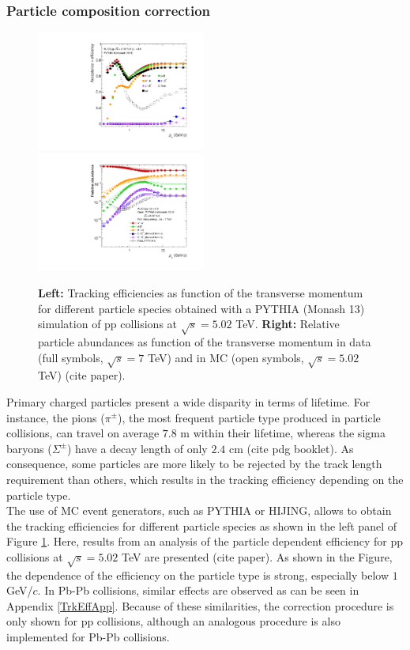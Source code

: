 \documentclass[12pt,a4paper]{report}
\begin{document}
\subsubsection{Particle composition correction}
\begin{figure}[tb!]
\centering
\includegraphics[width=0.495\textwidth]{Plots/5TeVMonash13_TrkEff_without-91972.pdf}  
\includegraphics[width=0.495\textwidth]{Plots/5TeVMonash13_Abundances-91973.pdf}  
\caption{\textbf{Left: }Tracking efficiencies as function of the transverse momentum for different particle species obtained with a PYTHIA (Monash 13) simulation of pp collisions at $\sqrt{s} = 5.02$ TeV. \textbf{Right:} Relative particle abundances as function of the transverse momentum in data (full symbols,  $\sqrt{s} = 7$ TeV) and in MC (open symbols,  $\sqrt{s} = 5.02$ TeV) (cite paper).}
\label{trckEffParticles}
\end{figure}
Primary charged particles present a wide disparity in terms of lifetime. For instance, the pions ($\pi^{\pm}$), the most frequent particle type produced in particle collisions, can travel on average $7.8\text{ m}$ within their lifetime, whereas the sigma baryons ($\Sigma^{\pm}$) have a decay length of only $2.4\text{ cm}$ (cite pdg booklet). As consequence, some particles are more likely to be rejected by the track length requirement than others, which results in the tracking efficiency depending on the particle type. \\
The use of MC event generators, such as PYTHIA or HIJING, allows to obtain the tracking efficiencies for different particle species as shown in the left panel of Figure \ref{trckEffParticles}. Here, results from  an analysis of the particle dependent efficiency for pp collisions at $\sqrt{s} = 5.02$ TeV are presented (cite paper). As shown in the Figure, the dependence of the efficiency on the particle type is strong, especially below $1$ GeV/$c$. In Pb-Pb collisions, similar effects are observed as can be seen in Appendix \ref{TrkEffApp}. Because of these similarities, the correction procedure is only shown for pp collisions, although an analogous procedure is also implemented for Pb-Pb collisions.\\
\end{document}
